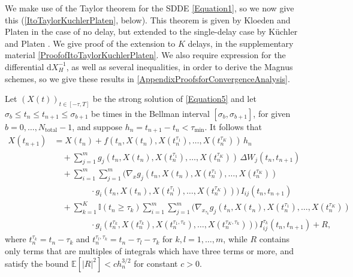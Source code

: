 \documentclass[onefignum]{siamart250211}
\providecommand{\abs}[1]{\left|#1\right|}
\begin{document}
We make use of the Taylor theorem for the SDDE \cref{Equation1}, so we now give this (\cref{ItoTaylorKuchlerPlaten}, below). This theorem is given by Kloeden and Platen \cite{KloedenPlaten1999} in the case of no delay, but extended to the single-delay case by K\"uchler and Platen \cite{KuchlerPlaten2000}. We give proof of the extension to $K$ delays, in the supplementary material \cref{ProofofItoTaylorKuchlerPlaten}. We also require expression for the differential $\mathrm{d}X_H^{-1}$, as well as several inequalities, in order to derive the Magnus schemes, so we give these results in \cref{AppendixProofsforConvergenceAnalysis}.

\begin{theorem}\label{ItoTaylorKuchlerPlaten}
Let $(X(t))_{t\in[-\tau,T]}$ be the strong solution of \cref{Equation5} and let $\sigma_b\leqslant t_n\leqslant t_{n+1}\leqslant \sigma_{b+1}$ be times in the Bellman interval $[\sigma_b,\sigma_{b+1}]$, for given $b=0,\ldots,{N_{\mathrm{total}}}-1$, and suppose $h_n=t_{n+1}-t_n<\tau_\mathrm{min}$. It follows that
\begin{align}
X(t_{n+1})&=X(t_n)+f(t_n,X(t_n),X(t_n^{\tau_1}),\ldots,X(t_n^{\tau_K}))\,h_n\nonumber\\
&\quad+\sum_{j=1}^mg_j(t_n,X(t_n),X(t_n^{\tau_1}),\ldots,X(t_n^{\tau_K}))\,\Delta W_j(t_n,t_{n+1})\label{DelayTaylorExpansion}\\
&\quad+\sum_{i=1}^m\sum_{j=1}^m\bigg(\nabla_xg_j(t_n,X(t_n),X(t_n^{\tau_1}),\ldots,X(t_n^{\tau_K}))\nonumber\\
&\quad\quad\hspace{1cm}\cdot g_i(t_n,X(t_n),X(t_n^{\tau_1}),\ldots,X(t_n^{\tau_K}))\bigg)\,I_{ij}(t_n,t_{n+1})\nonumber\\
&\quad+\sum_{k=1}^K\mathbb{I}(t_n\geqslant\tau_k)\sum_{i=1}^m\sum_{j=1}^m\bigg(\nabla_{x_{\tau_k}}g_j(t_n,X(t_n),X(t_n^{\tau_1}),\ldots,X(t_n^{\tau_K}))\nonumber\\
&\quad\quad\hspace{1cm}\cdot g_i(t_n^{\tau_k},X(t_n^{\tau_k}),X(t_n^{\tau_1,\tau_k}),\ldots,X(t_n^{\tau_K,\tau_k}))\bigg)\,I_{ij}^{\tau_k}(t_n,t_{n+1})+R,\nonumber
\end{align}
where $t_n^{\tau_k}=t_n-\tau_k$ and $t_n^{\tau_l,\tau_k}=t_n-\tau_l-\tau_k$ for $k,l=1,\ldots,m$, while $R$ contains only terms that are multiples of integrals which have three terms or more, and satisfy the bound $\mathbb{E}[\abs{R}^2]<ch_n^{3/2}$ for constant $c>0$.
\end{theorem}
\end{document}
